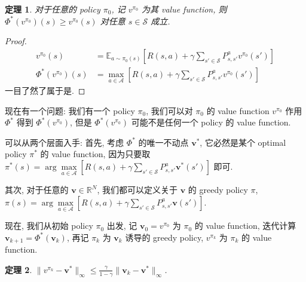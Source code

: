 \documentclass[8pt]{article}
\theoremstyle{compact}
\newtheorem{theorem}{定理}[section]
\def\le{\leqslant}
\def\ge{\geqslant}
\begin{document}
\begin{theorem}
	对于任意的 policy $\pi_0$, 记 $v^{\pi_0}$ 为其 value function, 则 $\Phi^*(v^{\pi_0})(s) \ge v^{\pi_0}(s)$ 对任意 $s \in \mathcal S$ 成立.
\end{theorem}
\begin{proof}
	\begin{align*}
		v^{\pi_0}(s) &= \mathbb E_{a \sim \pi_0(s)}\left[R(s, a) + \gamma\sum_{s' \in \mathcal S}P_{s, s'}^av^{\pi_0}(s')\right] \\
		\Phi^*(v^{\pi_0})(s) &= \max_{a \in \mathcal A}\left[R(s, a) + \gamma\sum_{s' \in \mathcal S}P_{s, s'}^av^{\pi_0}(s')\right]
	\end{align*}
	一目了然了属于是.
\end{proof}

现在有一个问题: 我们有一个 policy $\pi_0$, 我们可以对 $\pi_0$ 的 value function $v^{\pi_0}$ 作用 $\Phi^*$ 得到 $\Phi^*(v^{\pi_0})$, 但是 $\Phi^*(v^{\pi_0})$ 可能不是任何一个 policy 的 value function.

可以从两个层面入手: 首先, 考虑 $\Phi^*$ 的唯一不动点 $\mathbf v^*$, 它必然是某个 optimal policy $\pi^*$ 的 value function, 因为只要取 $\pi^*(s) = \arg\max\limits_{a \in \mathcal A}\left[R(s, a) + \gamma\sum\limits_{s' \in \mathcal S}P_{s, s'}^a\mathbf v^*(s')\right]$ 即可.

其次, 对于任意的 $\mathbf v \in \mathbb R^N$, 我们都可以定义关于 $\mathbf v$ 的 greedy policy $\pi$, $\pi(s) = \arg\max\limits_{a \in \mathcal A}\left[R(s, a) + \gamma\sum\limits_{s' \in \mathcal S}P_{s, s'}^a\mathbf v(s')\right]$.

现在, 我们从初始 policy $\pi_0$ 出发, 记 $\mathbf v_0 = v^{\pi_0}$ 为 $\pi_0$ 的 value function, 迭代计算 $\mathbf v_{k+1} = \Phi^*(\mathbf v_k)$, 再记 $\pi_k$ 为 $\mathbf v_k$ 诱导的 greedy policy, $v^{\pi_k}$ 为 $\pi_k$ 的 value function.

\begin{theorem}
	$\|v^{\pi_k} - \mathbf v^*\|_{\infty} \le \frac{\gamma}{1 - \gamma}\|\mathbf v_k - \mathbf v^*\|_{\infty}$.
\end{theorem}
\end{document}
